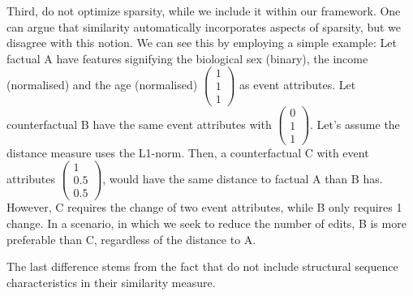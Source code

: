 \documentclass[./../../paper.tex]{subfiles}
\begin{document}
Third, \autocite{hsieh_DiCE4ELInterpretingProcess_2021} do not optimize sparsity, while we include it within our framework. One can argue that similarity automatically incorporates aspects of sparsity, but we disagree with this notion. We can see this by employing a simple example: Let factual A have features signifying the biological sex (binary), the income (normalised) and the age (normalised) $\begin{pmatrix}1\\1\\1\end{pmatrix}$ as event attributes. Let counterfactual B have the same event attributes with $\begin{pmatrix}0\\1\\1\end{pmatrix}$. Let's assume the distance measure uses the L1-norm. Then, a counterfactual C with event attributes $\begin{pmatrix}1\\0.5\\0.5\end{pmatrix}$, would have the same distance to factual A than B has. However, C requires the change of two event attributes, while B only requires 1 change. In a scenario, in which we seek to reduce the number of edits, B is more preferable than C, regardless of the distance to A.

The last difference stems from the fact that \citeauthor{hsieh_DiCE4ELInterpretingProcess_2021} do not include structural sequence characteristics in their similarity measure. 
\end{document}
